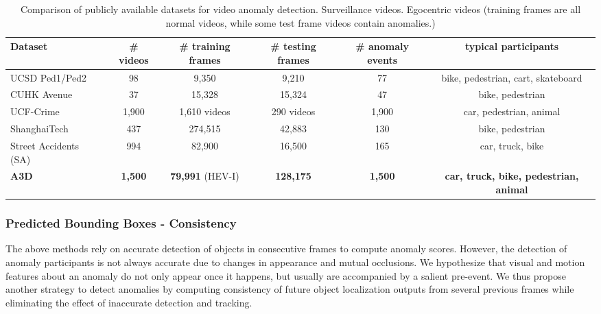 \documentclass[letterpaper, 10 pt, conference]{ieeeconf}
\theoremstyle{definition}
\theoremstyle{remark}
\begin{document}
\begin{table*}[h]
    \vspace{5pt}
    \centering
    \renewcommand{\arraystretch}{1.3}
    \caption{Comparison of publicly available datasets for video anomaly detection.
    Surveillance videos. Egocentric videos (training frames are all normal videos, while some test frame videos contain anomalies.) }
    \label{tab:dataset}
    \begin{tabular}{l|c|c|c|c|c}
        \toprule
        Dataset & \# videos & \# training frames & \# testing frames & \# anomaly events & typical participants \\
        \midrule
        UCSD Ped1/Ped2~\cite{li2014anomaly} & 98 & 9,350 & 9,210 & 77 & bike, pedestrian, cart, skateboard \\
        CUHK Avenue~\cite{lu2013abnormal} & 37 & 15,328 & 15,324 & 47 & bike, pedestrian  \\
        UCF-Crime~\cite{Sultani_2018_CVPR} & 1,900 &1,610 videos & 290 videos & 1,900 & car, pedestrian, animal \\
        ShanghaiTech~\cite{luo2017revisit} & 437 & 274,515 & 42,883 & 130 & bike, pedestrian \\
        Street Accidents (SA)~\cite{chan2016anticipating} & 994 & 82,900 & 16,500 & 165 & car, truck, bike \\
        \textbf{A3D} & \textbf{1,500} & \textbf{79,991} (HEV-I) & \textbf{128,175} & \textbf{1,500} & \textbf{car, truck, bike, pedestrian, animal}  \\
        \bottomrule
    \end{tabular}
    \vspace{-15pt}
\end{table*}

\subsubsection{Predicted Bounding Boxes - Consistency}
\label{sec:metrics_three}
The above methods rely on accurate detection of objects in consecutive
frames to compute anomaly scores. However, the detection of anomaly
participants is not always accurate due to changes in appearance
and mutual occlusions. We hypothesize that visual and motion features
about an anomaly do not only appear once it happens, but usually are
accompanied by a salient pre-event. We thus propose another strategy
to detect anomalies by computing consistency of future object localization
outputs from several previous frames while eliminating the effect of
inaccurate detection and tracking.
\end{document}
